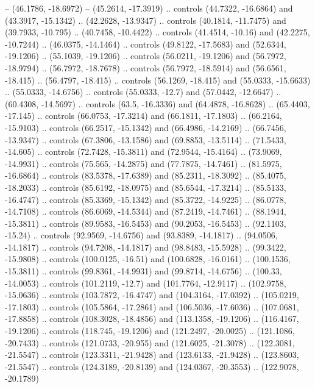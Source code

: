 {    -- (46.1786, -18.6972)
    -- (45.2614, -17.3919)
    .. controls (44.7322, -16.6864) and (43.3917, -15.1342) .. (42.2628, -13.9347)
    .. controls (40.1814, -11.7475) and (39.7933, -10.795) .. (40.7458, -10.4422)
    .. controls (41.4514, -10.16) and (42.2275, -10.7244) .. (46.0375, -14.1464)
    .. controls (49.8122, -17.5683) and (52.6344, -19.1206) .. (55.1039, -19.1206)
    .. controls (56.0211, -19.1206) and (56.7972, -18.9794) .. (56.7972, -18.7678)
    .. controls (56.7972, -18.5914) and (56.6561, -18.415) .. (56.4797, -18.415)
    .. controls (56.1269, -18.415) and (55.0333, -15.6633) .. (55.0333, -14.6756)
    .. controls (55.0333, -12.7) and (57.0442, -12.6647) .. (60.4308, -14.5697)
    .. controls (63.5, -16.3336) and (64.4878, -16.8628) .. (65.4403, -17.145)
    .. controls (66.0753, -17.3214) and (66.1811, -17.1803) .. (66.2164, -15.9103)
    .. controls (66.2517, -15.1342) and (66.4986, -14.2169) .. (66.7456, -13.9347)
    .. controls (67.3806, -13.1586) and (69.8853, -13.5114) .. (71.5433, -14.605)
    .. controls (72.7428, -15.3811) and (72.9544, -15.4164) .. (73.9069, -14.9931)
    .. controls (75.565, -14.2875) and (77.7875, -14.7461) .. (81.5975, -16.6864)
    .. controls (83.5378, -17.6389) and (85.2311, -18.3092) .. (85.4075, -18.2033)
    .. controls (85.6192, -18.0975) and (85.6544, -17.3214) .. (85.5133, -16.4747)
    .. controls (85.3369, -15.1342) and (85.3722, -14.9225) .. (86.0778, -14.7108)
    .. controls (86.6069, -14.5344) and (87.2419, -14.7461) .. (88.1944, -15.3811)
    .. controls (89.9583, -16.5453) and (90.2053, -16.5453) .. (92.1103, -15.24)
    .. controls (92.9569, -14.6756) and (93.8389, -14.1817) .. (94.0506, -14.1817)
    .. controls (94.7208, -14.1817) and (98.8483, -15.5928) .. (99.3422, -15.9808)
    .. controls (100.0125, -16.51) and (100.6828, -16.0161) .. (100.1536, -15.3811)
    .. controls (99.8361, -14.9931) and (99.8714, -14.6756) .. (100.33, -14.0053)
    .. controls (101.2119, -12.7) and (101.7764, -12.9117) .. (102.9758, -15.0636)
    .. controls (103.7872, -16.4747) and (104.3164, -17.0392) .. (105.0219, -17.1803)
    .. controls (105.5864, -17.2861) and (106.5036, -17.6036) .. (107.0681, -17.8858)
    .. controls (108.3028, -18.4856) and (113.1358, -19.1206) .. (116.4167, -19.1206)
    .. controls (118.745, -19.1206) and (121.2497, -20.0025) .. (121.1086, -20.7433)
    .. controls (121.0733, -20.955) and (121.6025, -21.3078) .. (122.3081, -21.5547)
    .. controls (123.3311, -21.9428) and (123.6133, -21.9428) .. (123.8603, -21.5547)
    .. controls (124.3189, -20.8139) and (124.0367, -20.3553) .. (122.9078, -20.1789)
}
